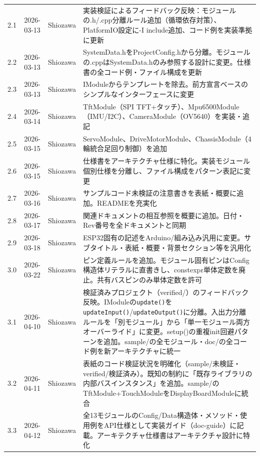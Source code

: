 \begin{longtable}{c c c p{}}
2.1 & 2026-03-13 & Shiozawa & 実装検証によるフィードバック反映：モジュールの.h/.cpp分離ルール追加（循環依存対策）、PlatformIO設定に-I include追加、コード例を実装準拠に更新 \\
2.2 & 2026-03-13 & Shiozawa & SystemData.hをProjectConfig.hから分離。モジュールの.cppはSystemData.hのみ参照する設計に変更。仕様書の全コード例・ファイル構成を更新 \\
2.3 & 2026-03-13 & Shiozawa & IModuleからテンプレートを除去。前方宣言ベースのシンプルなインターフェースに変更 \\
2.4 & 2026-03-14 & Shiozawa & TftModule（SPI TFT+タッチ）、Mpu6500Module（IMU/I2C）、CameraModule（OV5640）を実装・追記 \\
2.5 & 2026-03-15 & Shiozawa & ServoModule、DriveMotorModule、ChassisModule（4輪統合足回り制御）を追加 \\
2.6 & 2026-03-15 & Shiozawa & 仕様書をアーキテクチャ仕様に特化。実装モジュール個別仕様を分離し、ファイル構成をパターン表記に変更 \\
2.7 & 2026-03-16 & Shiozawa & サンプルコード未検証の注意書きを表紙・概要に追加。READMEを充実化 \\
2.8 & 2026-03-17 & Shiozawa & 関連ドキュメントの相互参照を概要に追加。日付・Rev番号を全ドキュメントと同期 \\
2.9 & 2026-03-18 & Shiozawa & ESP32固有の記述をArduino/組み込み汎用に変更。サブタイトル・表紙・概要・背景セクション等を汎用化 \\
3.0 & 2026-03-22 & Shiozawa & ピン定義ルールを追加。モジュール固有ピンはConfig構造体リテラルに直書きし、constexpr単体定数を廃止。共有バスピンのみ単体定数を許可 \\
3.1 & 2026-04-10 & Shiozawa & 検証済みプロジェクト（verified/）のフィードバック反映。IModuleの\texttt{update()}を\texttt{updateInput()}/\texttt{updateOutput()}に分離。入出力分離ルールを「別モジュール」から「単一モジュール両方オーバーライド」に変更。setup()の重複init回避パターンを追加。sample/の全モジュール・doc/の全コード例を新アーキテクチャに統一 \\
3.2 & 2026-04-11 & Shiozawa & 表紙のコード検証状況を明確化（sample/未検証・verified/検証済み）。既知の制約に「既存ライブラリの内部バスインスタンス」を追加。sample/のTftModule+TouchModuleをDisplayBoardModuleに統合 \\
3.3 & 2026-04-12 & Shiozawa & 全13モジュールのConfig/Data構造体・メソッド・使用例をAPI仕様として実装ガイド（doc-guide）に記載。アーキテクチャ仕様書はアーキテクチャ設計に特化 \\
\end{longtable}
